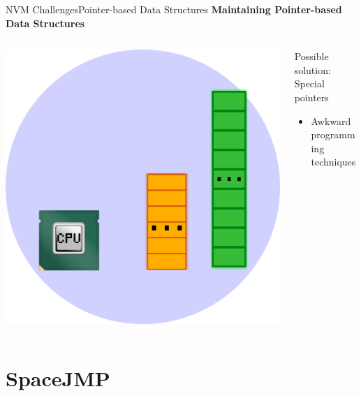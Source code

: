 \documentclass[10pt]{beamer}
\begin{document}
\begin{frame}{NVM Challenges}{Pointer-based Data Structures}
  \textbf{Maintaining Pointer-based Data Structures}

  \begin{columns}[T]
    \begin{column}{.2\textwidth}
      \includegraphics[width=1.7\textwidth, keepaspectratio=true]{images/increase_physical_address.png}
    \end{column} \pause

    \hfill
    \begin{column}{.7\textwidth}
      Possible solution: Special pointers \pause
      \begin{itemize}
        \item Awkward programming techniques
      \end{itemize}
    \end{column}

  \end{columns}
\end{frame}

\section{SpaceJMP}
\end{document}
